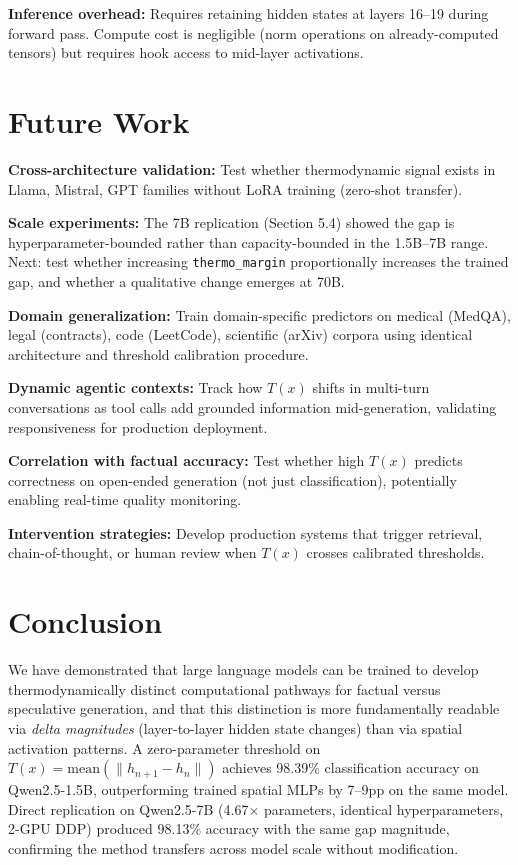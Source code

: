 \documentclass[11pt,a4paper]{article}
\begin{document}
\textbf{Inference overhead:} Requires retaining hidden states at layers 16--19 during forward pass. Compute cost is negligible (norm operations on already-computed tensors) but requires hook access to mid-layer activations.

\section{Future Work}

\textbf{Cross-architecture validation:} Test whether thermodynamic signal exists in Llama, Mistral, GPT families without LoRA training (zero-shot transfer).

\textbf{Scale experiments:} The 7B replication (Section 5.4) showed the gap is hyperparameter-bounded rather than capacity-bounded in the 1.5B--7B range. Next: test whether increasing \texttt{thermo\_margin} proportionally increases the trained gap, and whether a qualitative change emerges at 70B.

\textbf{Domain generalization:} Train domain-specific predictors on medical (MedQA), legal (contracts), code (LeetCode), scientific (arXiv) corpora using identical architecture and threshold calibration procedure.

\textbf{Dynamic agentic contexts:} Track how $T(x)$ shifts in multi-turn conversations as tool calls add grounded information mid-generation, validating responsiveness for production deployment.

\textbf{Correlation with factual accuracy:} Test whether high $T(x)$ predicts correctness on open-ended generation (not just classification), potentially enabling real-time quality monitoring.

\textbf{Intervention strategies:} Develop production systems that trigger retrieval, chain-of-thought, or human review when $T(x)$ crosses calibrated thresholds.

\section{Conclusion}

We have demonstrated that large language models can be trained to develop thermodynamically distinct computational pathways for factual versus speculative generation, and that this distinction is more fundamentally readable via \emph{delta magnitudes} (layer-to-layer hidden state changes) than via spatial activation patterns. A zero-parameter threshold on $T(x) = \text{mean}(\|h_{n+1} - h_n\|)$ achieves 98.39\% classification accuracy on Qwen2.5-1.5B, outperforming trained spatial MLPs by 7--9pp on the same model. Direct replication on Qwen2.5-7B (4.67$\times$ parameters, identical hyperparameters, 2-GPU DDP) produced 98.13\% accuracy with the same gap magnitude, confirming the method transfers across model scale without modification.
\end{document}
